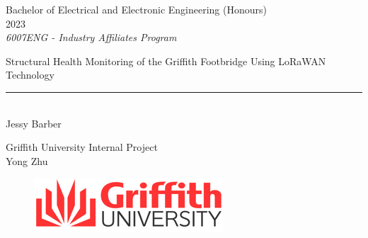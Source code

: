 \documentclass[12pt]{report} %
\begin{document}
	

\begin{titlepage}
	\begin{sffamily}
	\color{azulUC3M}
	\begin{center}

		\vspace{2.5cm}
		\begin{Large}
			Bachelor of Electrical and Electronic Engineering (Honours)\\			
			 2023\\ %
			\vspace{2cm}		
			\textsl{6007ENG - Industry Affiliates Program}
			\bigskip
			
		\end{Large}
		 	{\Huge Structural Health Monitoring of the Griffith Footbridge Using LoRaWAN Technology}\\
		 	\vspace*{0.5cm}
	 		\rule{10.5cm}{0.1mm}\\
			\vspace*{0.9cm}
			{\LARGE Jessy Barber}\\ 
			\vspace*{1cm}
		\begin{Large}
			Griffith University Internal Project\\
			Yong Zhu
		\end{Large}
	\end{center}
	\vfill
	\begin{figure}
		\includegraphics{griffithlogo.png}
	\end{figure}
	\end{sffamily}
\end{titlepage}
\end{document}
